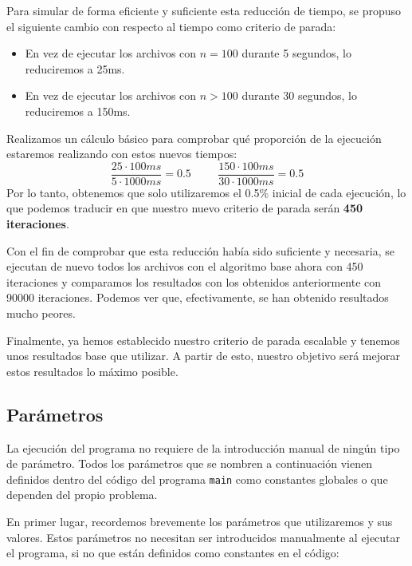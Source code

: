 Para simular de forma eficiente y suficiente esta reducción de tiempo, se propuso el siguiente cambio con respecto al tiempo como criterio de parada:
\begin{itemize}
	\item En vez de ejecutar los archivos con $n=100$ durante 5 segundos, lo reduciremos a 25ms.
	\item En vez de ejecutar los archivos con $n>100$ durante 30 segundos, lo reduciremos a 150ms.
\end{itemize}
Realizamos un cálculo básico para comprobar qué proporción de la ejecución estaremos realizando con estos nuevos tiempos:
\begin{equation*}
\dfrac{25\cdot 100ms}{5\cdot 1000ms} = 0.5
\hspace{1cm}
\dfrac{150\cdot 100ms}{30\cdot 1000ms} = 0.5
\end{equation*}
Por lo tanto, obtenemos que solo utilizaremos el 0.5\% inicial de cada ejecución, lo que podemos traducir en que nuestro nuevo criterio de parada serán \textbf{450 iteraciones}. 

Con el fin de comprobar que esta reducción había sido suficiente y necesaria, se ejecutan de nuevo todos los archivos con el algoritmo base ahora con 450 iteraciones y comparamos los resultados con los obtenidos anteriormente con 90000 iteraciones. 
Podemos ver que, efectivamente, se han obtenido resultados mucho peores. 

Finalmente, ya hemos establecido nuestro criterio de parada escalable y tenemos unos resultados base que utilizar. 
A partir de esto, nuestro objetivo será mejorar estos resultados lo máximo posible.

\subsection{Parámetros}

La ejecución del programa no requiere de la introducción manual de ningún tipo de parámetro. 
Todos los parámetros que se nombren a continuación vienen definidos dentro del código del programa \texttt{main} como constantes globales o que dependen del propio problema. 

En primer lugar, recordemos brevemente los parámetros que utilizaremos y sus valores. 
Estos parámetros no necesitan ser introducidos manualmente al ejecutar el programa, si no que están definidos como constantes en el código:

